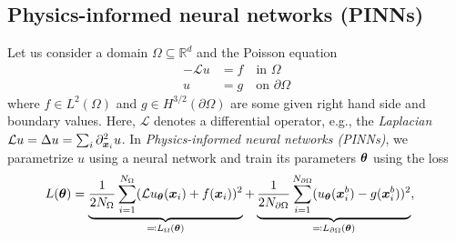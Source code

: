 \subsection{Physics-informed neural networks (PINNs)}
Let us consider a domain $\Omega\subseteq\mathbb R^d$ and the Poisson equation %
\begin{align*}\tag{PE}\label{eq:PE}
  -\mathcal{L} u & = f \quad \text{in }\Omega \\
  u & = g \quad \text{on }\partial\Omega
\end{align*}
where $f\in L^2(\Omega)$ and $g\in H^{3/2}(\partial\Omega)$ are some given right hand side and boundary values.
Here, $\mathcal{L}$ denotes a differential operator, e.g., the \emph{Laplacian} $\mathcal{L} u = \Delta u = \sum_i \partial_{{\bm{x}}_i}^2 u$.
In \emph{Physics-informed neural networks (PINNs)}, we parametrize $u$ using a neural network and train its parameters ${\bm{\theta}}$ using the loss
\begin{align}
  L({\bm{\theta}})
  &=
    \underbrace{\frac{1}{2N_\Omega} \sum_{i=1}^{N_\Omega} (\mathcal{L} u_{\bm{\theta}}({\bm{x}}_i) + f({\bm{x}}_i))^2}_{\eqqcolon L_\Omega({\bm{\theta}})} + \underbrace{\frac{1}{2N_{\partial\Omega}}\sum_{i=1}^{N_{\partial\Omega}} ( u_{\bm{\theta}}({\bm{x}}^b_i) - g({\bm{x}}^b_i))^2}_{\eqqcolon L_{\partial\Omega}({\bm{\theta}})},
\end{align}

